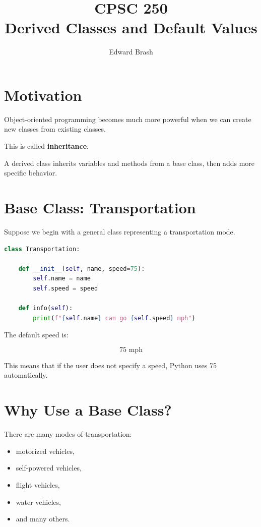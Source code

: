 \documentclass[11pt]{article}
\title{CPSC 250 \\ Derived Classes and Default Values}
\author{Edward Brash}
\date{}
\begin{document}
\maketitle

\section{Motivation}

Object-oriented programming becomes much more powerful when we can create new classes from existing classes.

This is called \textbf{inheritance}.

A derived class inherits variables and methods from a base class, then adds more specific behavior.

\section{Base Class: Transportation}

Suppose we begin with a general class representing a transportation mode.

\begin{lstlisting}[language=Python]
class Transportation:

    def __init__(self, name, speed=75):
        self.name = name
        self.speed = speed

    def info(self):
        print(f"{self.name} can go {self.speed} mph")
\end{lstlisting}

The default speed is:

\[
75 \text{ mph}
\]

This means that if the user does not specify a speed, Python uses 75 automatically.

\section{Why Use a Base Class?}

There are many modes of transportation:

\begin{itemize}
    \item motorized vehicles,
    \item self-powered vehicles,
    \item flight vehicles,
    \item water vehicles,
    \item and many others.
\end{itemize}
\end{document}
